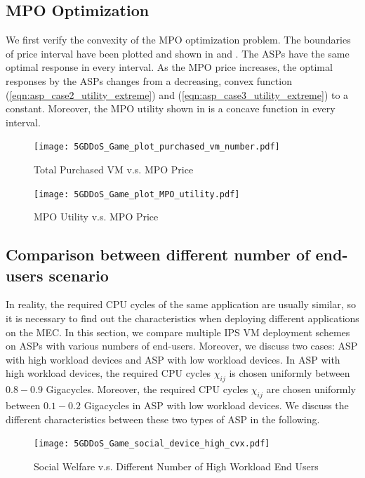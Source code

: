 \documentclass[conference]{IEEEtran}
\begin{document}
\subsection{MPO Optimization}\label{MPO_opti}
We first verify the convexity of the MPO optimization problem. The boundaries of price interval have been plotted and shown in  and . The ASPs have the same optimal response in every interval. As the MPO price increases, the optimal responses by the ASPs changes from a decreasing, convex function (\ref{eqn:asp_case2_utility_extreme}) and (\ref{eqn:asp_case3_utility_extreme}) to a constant. Moreover, the MPO utility shown in  is a concave function in every interval. 

\begin{figure}[!ht]
  \texttt{[image: 5GDDoS\_Game\_plot\_purchased\_vm\_number.pdf]}
  \caption{Total Purchased VM v.s. MPO Price}
  \label{fig:VMnum}
\end{figure}

\begin{figure}[!ht]
  \texttt{[image: 5GDDoS\_Game\_plot\_MPO\_utility.pdf]}
\caption{MPO Utility v.s. MPO Price}
\label{fig:MPOutil}
\end{figure}

\subsection{Comparison between different number of end-users scenario}
In reality, the required CPU cycles of the same application are usually similar, so it is necessary to find out the characteristics when deploying different applications on the MEC. In this section, we compare multiple IPS VM deployment schemes on ASPs with various numbers of end-users. Moreover, we discuss two cases: ASP with high workload devices and ASP with low workload devices. In ASP with high workload devices, the required CPU cycles $\chi_{ij}$ is chosen uniformly between $0.8 - 0.9$ Gigacycles. Moreover, the required CPU cycles $\chi_{ij}$ are chosen uniformly between $0.1 - 0.2$ Gigacycles in ASP with low workload devices. We discuss the different characteristics between these two types of ASP in the following. 

\begin{figure}[!ht]
  \texttt{[image: 5GDDoS\_Game\_social\_device\_high\_cvx.pdf]}
    \caption{Social Welfare v.s. Different Number of High Workload End Users}
\label{fig:num_cmp_soc_high}
\end{figure}
\end{document}
